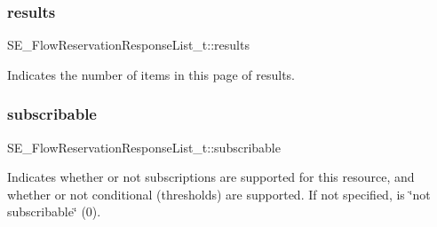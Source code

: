 \subsubsection{\texorpdfstring{results}{results}}
{\footnotesize\ttfamily S\+E\+\_\+\+Flow\+Reservation\+Response\+List\+\_\+t\+::results}

Indicates the number of items in this page of results. \mbox{\label{group__FlowReservationResponseList_gade27c5a37e139e3291bdf606cf6d95e9}} 
\subsubsection{\texorpdfstring{subscribable}{subscribable}}
{\footnotesize\ttfamily S\+E\+\_\+\+Flow\+Reservation\+Response\+List\+\_\+t\+::subscribable}

Indicates whether or not subscriptions are supported for this resource, and whether or not conditional (thresholds) are supported. If not specified, is \char`\"{}not subscribable\char`\"{} (0). 